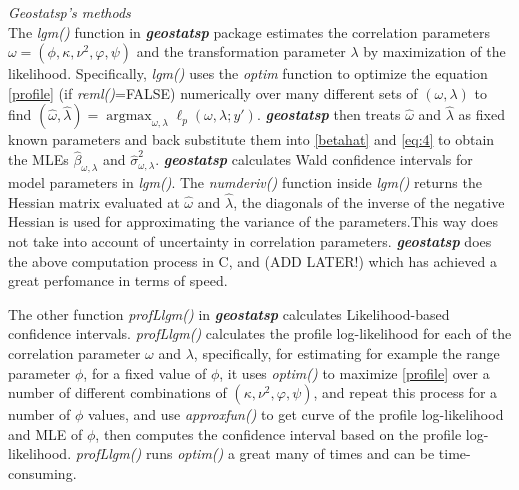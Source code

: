 \documentclass{article}\usepackage[]{graphicx}\usepackage[]{color}
\DeclareMathOperator*{\argmax}{argmax}
\newcommand{\prog}[1]{\textsf{#1}}
\newcommand{\pkg}[1]{\textbf{\emph{#1}}}
\newcommand{\fct}[1]{\textit{#1()}}
\def\MVN{{\mathrm{MVN}}}
\newtheorem{theorem}{Theorem}[section]
\begin{document}
\textit{Geostatsp's methods}\vspace{0.5cm}\\
The \fct{lgm} function in \pkg{geostatsp} package estimates the correlation parameters $\omega=(\phi,\kappa,\nu^2, \varphi, \psi)$ and the transformation parameter $\lambda$ by maximization of the likelihood. Specifically, \fct{lgm} uses the \textit{optim} function to optimize the equation \eqref{profile} (if \fct{reml}=FALSE)  numerically over many different sets of $(\omega, \lambda)$ to find $(\hat{\omega},\hat{\lambda}) = \argmax_{\omega,\lambda} \ell_p(\omega, \lambda; y')$.  \pkg{geostatsp} then treats $\hat{\omega}$ and $\hat{\lambda}$ as fixed known parameters and back substitute them into \eqref{betahat} and \eqref{eq:4} to obtain the MLEs $\hat{\beta}_{\omega,\lambda}$ and $\hat{\sigma}^2_{\omega,\lambda}$.  \pkg{geostatsp} calculates Wald confidence intervals for model parameters in \fct{lgm}. The \fct{numderiv} function inside \fct{lgm} returns the Hessian matrix evaluated at $\hat{\omega}$ and $\hat{\lambda}$, the diagonals of the inverse of the negative Hessian is used for approximating the variance of the parameters.This way does not take into account of uncertainty in correlation parameters. \pkg{geostatsp} does the above computation process in \prog{C}, and (ADD LATER!) which has achieved a great perfomance in terms of speed.      

The other function \fct{profLlgm} in \pkg{geostatsp} calculates Likelihood-based confidence intervals. \fct{profLlgm} calculates the profile log-likelihood for each of the correlation parameter $\omega$ and $\lambda$, specifically, for estimating for example the range parameter $\phi$, for a fixed value of $\phi$, it uses \fct{optim} to maximize \eqref{profile} over a number of different combinations of $(\kappa,\nu^2, \varphi, \psi)$, and repeat this process for a number of $\phi$ values, and use \fct{approxfun} to get curve of the profile log-likelihood and MLE of $\phi$, then computes the confidence interval based on the profile log-likelihood.  \fct{profLlgm} runs \fct{optim} a great many of times and can be time-consuming.
\end{document}
